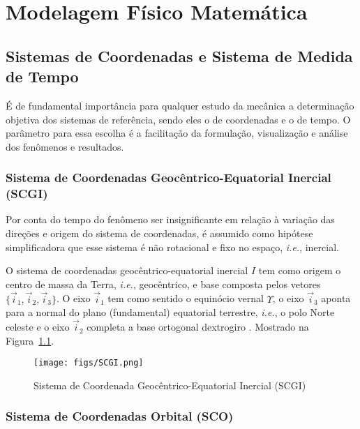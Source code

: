 \chapter{Modelagem Físico Matemática}\label{cap:ferramentas}

\section{Sistemas de Coordenadas e Sistema de Medida de Tempo}\label{sec:3.1.1}

É de fundamental importância para qualquer estudo da mecânica a determinação objetiva dos sistemas de referência, sendo eles o de coordenadas e o de tempo. O parâmetro para essa escolha é a facilitação da formulação, visualização e análise dos fenômenos e resultados.

\subsection{Sistema de Coordenadas Geocêntrico-Equatorial Inercial (SCGI)}\label{sec:3.1.1.1}

Por conta do tempo do fenômeno ser insignificante em relação à variação das direções e origem do sistema de coordenadas, é assumido como hipótese simplificadora que esse sistema é não rotacional e fixo no espaço, \textit{i.e.}, inercial. 

O sistema de coordenadas geocêntrico-equatorial inercial \begin{math}I\end{math} tem como origem o centro de massa da Terra, \textit{i.e.}, geocêntrico, e base composta pelos vetores \begin{math}\{\vec{i}_1,\vec{i}_2,\vec{i}_3\}\end{math}. O eixo $\vec{i}_1$ tem como sentido o equinócio vernal $\Upsilon$, o eixo $\vec{i}_3$ aponta para a normal do plano (fundamental) equatorial terrestre, \textit{i.e.}, o polo Norte celeste e o eixo $\vec{i}_2$ completa a base ortogonal dextrogiro \cite[p.~12-13]{zanardi2018}. Mostrado na Figura~\ref{fig:11}.

\begin{figure}[htpb]
\centering
\texttt{[image: figs/SCGI.png]}
\caption{Sistema de Coordenada Geocêntrico-Equatorial Inercial (SCGI)}
\label{fig:11}
\end{figure}

\subsection{Sistema de Coordenadas Orbital (SCO)}\label{sec:3.1.1.2}

